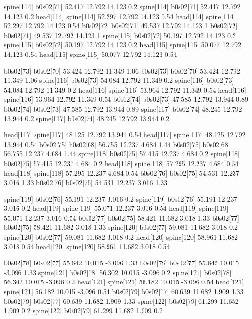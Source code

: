 spine[114]    b0s02[71]    52.417    12.792    14.123    0.2
spine[114]    b0s02[71]    52.417    12.792    14.123    0.2
head[114]    spine[114]    52.297    12.792    14.123    0.54
head[114]    spine[114]    52.297    12.792    14.123    0.54
b0s02[72]    b0s02[71]    49.537    12.792    14.123    1
b0s02[72]    b0s02[71]    49.537    12.792    14.123    1
spine[115]    b0s02[72]    50.197    12.792    14.123    0.2
spine[115]    b0s02[72]    50.197    12.792    14.123    0.2
head[115]    spine[115]    50.077    12.792    14.123    0.54
head[115]    spine[115]    50.077    12.792    14.123    0.54


b0s02[73]    b0s02[70]    53.424    12.792    11.349    1.06
b0s02[73]    b0s02[70]    53.424    12.792    11.349    1.06
spine[116]    b0s02[73]    54.084    12.792    11.349    0.2
spine[116]    b0s02[73]    54.084    12.792    11.349    0.2
head[116]    spine[116]    53.964    12.792    11.349    0.54
head[116]    spine[116]    53.964    12.792    11.349    0.54
b0s02[74]    b0s02[73]    47.585    12.792    13.944    0.89
b0s02[74]    b0s02[73]    47.585    12.792    13.944    0.89
spine[117]    b0s02[74]    48.245    12.792    13.944    0.2
spine[117]    b0s02[74]    48.245    12.792    13.944    0.2


head[117]    spine[117]    48.125    12.792    13.944    0.54
head[117]    spine[117]    48.125    12.792    13.944    0.54
b0s02[75]    b0s02[68]    56.755    12.237    4.684    1.44
b0s02[75]    b0s02[68]    56.755    12.237    4.684    1.44
spine[118]    b0s02[75]    57.415    12.237    4.684    0.2
spine[118]    b0s02[75]    57.415    12.237    4.684    0.2
head[118]    spine[118]    57.295    12.237    4.684    0.54
head[118]    spine[118]    57.295    12.237    4.684    0.54
b0s02[76]    b0s02[75]    54.531    12.237    3.016    1.33
b0s02[76]    b0s02[75]    54.531    12.237    3.016    1.33


spine[119]    b0s02[76]    55.191    12.237    3.016    0.2
spine[119]    b0s02[76]    55.191    12.237    3.016    0.2
head[119]    spine[119]    55.071    12.237    3.016    0.54
head[119]    spine[119]    55.071    12.237    3.016    0.54
b0s02[77]    b0s02[75]    58.421    11.682    3.018    1.33
b0s02[77]    b0s02[75]    58.421    11.682    3.018    1.33
spine[120]    b0s02[77]    59.081    11.682    3.018    0.2
spine[120]    b0s02[77]    59.081    11.682    3.018    0.2
head[120]    spine[120]    58.961    11.682    3.018    0.54
head[120]    spine[120]    58.961    11.682    3.018    0.54


b0s02[78]    b0s02[77]    55.642    10.015    -3.096    1.33
b0s02[78]    b0s02[77]    55.642    10.015    -3.096    1.33
spine[121]    b0s02[78]    56.302    10.015    -3.096    0.2
spine[121]    b0s02[78]    56.302    10.015    -3.096    0.2
head[121]    spine[121]    56.182    10.015    -3.096    0.54
head[121]    spine[121]    56.182    10.015    -3.096    0.54
b0s02[79]    b0s02[77]    60.639    11.682    1.909    1.33
b0s02[79]    b0s02[77]    60.639    11.682    1.909    1.33
spine[122]    b0s02[79]    61.299    11.682    1.909    0.2
spine[122]    b0s02[79]    61.299    11.682    1.909    0.2


